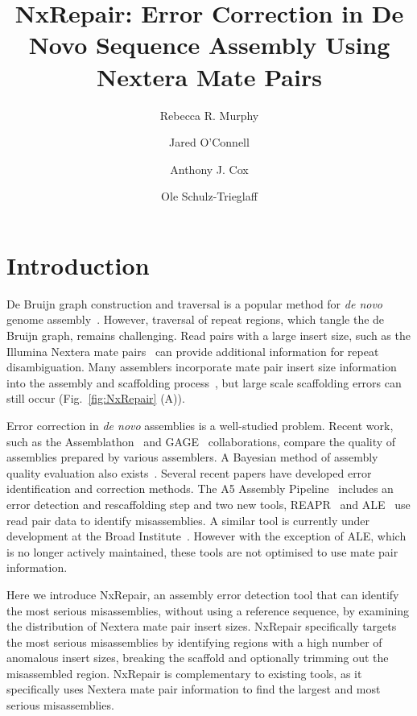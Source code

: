 \documentclass[fleqn,10pt]{wlpeerj}
\title{NxRepair: Error Correction in De Novo Sequence Assembly Using Nextera Mate Pairs}
\author[1]{Rebecca R. Murphy}
\author[2]{Jared O'Connell}
\author[2]{Anthony J. Cox}
\author[2]{Ole Schulz-Trieglaff}
\affil[1]{Department of Chemistry, University of Cambridge, UK}
\affil[2]{Illumina Cambridge, Chesterford Research Park, Essex, CB10 1XL}
\begin{document}
\flushbottom
\maketitle
\thispagestyle{empty}

\section*{Introduction}
De Bruijn graph construction and traversal is a popular method for \textit{de novo} genome assembly~\citep{compeau2011}. However, traversal of repeat regions, which tangle the de Bruijn graph, remains challenging. Read pairs with a large insert size, such as the Illumina Nextera mate pairs~\citep{nextera2012} can provide additional information for repeat disambiguation. Many assemblers incorporate mate pair insert size information into the assembly and scaffolding process~\citep{Bankevich2012, zerbino2008}, but large scale scaffolding errors can still occur (Fig.~\ref{fig:NxRepair} (A)). 

Error correction in \textit{de novo} assemblies is a well-studied problem. Recent work, such as the Assemblathon~\citep{Bradnam2013} and GAGE~\citep{Salzberg2012} collaborations, compare the quality of assemblies prepared by various assemblers. A Bayesian method of assembly quality evaluation also exists~\citep{Ghodsi2013}. Several recent papers have developed error identification and correction methods. The A5 Assembly Pipeline~\citep{Coil2014, tritt2012} includes an error detection and rescaffolding step and two new tools, REAPR~\citep{Hunt2013} and ALE~\citep{Clark2013} use read pair data to identify misassemblies. A similar tool is currently under development at the Broad Institute~\citep{pilon2014}. However with the exception of ALE, which is no longer actively maintained, these tools are not optimised to use mate pair information.  

Here we introduce NxRepair, an assembly error detection tool that can identify the most serious misassemblies, without using a reference sequence, by examining the distribution of Nextera mate pair insert sizes. NxRepair specifically targets the most serious misassemblies by identifying regions with a high number of anomalous insert sizes, breaking the scaffold and optionally trimming out the misassembled region. NxRepair is complementary to existing tools, as it specifically uses Nextera mate pair information to find the largest and most serious misassemblies.
\end{document}
